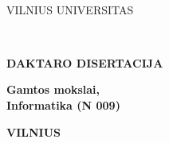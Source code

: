\newpage
\thispagestyle{empty}                   %
{\selectfont
\linespread{1.15}\selectfont
\renewcommand\bfdefault{m}
\begin{flushright}
    \thesisDOI \\
    \thesisORCID
\end{flushright}

\begin{center}
	\vspace*{5mm}	
	\begin{flushleft}
         \fontsize{12}{12}\selectfont
	       VILNIUS UNIVERSITAS \\
	\end{flushleft}
 
	\vspace{50mm}
	\begin{flushleft}
	   {\fontsize{15}{15}\selectfont  \thesisAuthorName  \\ \MakeUppercase{\thesisAuthorSurname} \par}
    \end{flushleft}

	\vspace{10mm}
	\begin{flushleft}
    	{ \fontsize{21}{21}\selectfont
    	   \thesisTitleLT \par
    	}
    \end{flushleft}

    \vspace{50mm}
    \begin{flushleft}
        \renewcommand\bfdefault{b}
        \fontsize{12}{12}\selectfont
        {\bf DAKTARO DISERTACIJA}\\ 
    \end{flushleft}
    
    \vspace{5mm}
    \begin{flushleft}
        \renewcommand\bfdefault{m}
        \fontsize{12}{12}\selectfont
        \bf
            Gamtos mokslai, \\ %
            Informatika (N 009)  %
    \end{flushleft}
    
    \vspace{6mm}
    \begin{flushleft} 
         \fontsize{9}{9}\selectfont
        \bf VILNIUS \thesisYear
    \end{flushleft} 
\end{center}
}

